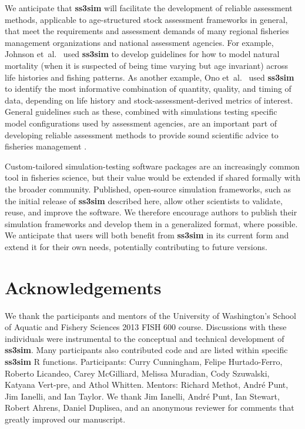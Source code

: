 \documentclass[11pt]{article}
\begin{document}
\begin{spacing}{1.2}
We anticipate that \textbf{ss3sim} will facilitate the development of reliable
assessment methods, applicable to age-structured stock assessment frameworks in
general, that meet the requirements and assessment demands of many regional
fisheries management organizations and national assessment agencies. For
example, Johnson et~al.~\cite{johnson2014} used \textbf{ss3sim} to
develop guidelines for how to model natural mortality (when it is suspected of
being time varying but age invariant) across life histories and fishing
patterns. As another example, Ono et~al.~\cite{ono2014} used
\textbf{ss3sim} to identify the most informative combination of quantity,
quality, and timing of data, depending on life history and
stock-assessment-derived metrics of interest. General guidelines such as these,
combined with simulations testing specific model configurations used by
assessment agencies, are an important part of developing reliable assessment
methods to provide sound scientific advice to fisheries management
\cite{deroba2014, crone2013}.

Custom-tailored simulation-testing software packages are an increasingly common
tool in fisheries science, but their value would be extended if shared formally
with the broader community. Published, open-source simulation frameworks, such
as the initial release of \textbf{ss3sim} described here, allow other
scientists to validate, reuse, and improve the software. We therefore encourage
authors to publish their simulation frameworks and develop them in a
generalized format, where possible. We anticipate that users will both benefit
from \textbf{ss3sim} in its current form and extend it for their own needs,
potentially contributing to future versions.

\section*{Acknowledgements}

We thank the participants and mentors of the University of Washington's School
of Aquatic and Fishery Sciences 2013 FISH 600 course. Discussions with these
individuals were instrumental to the conceptual and technical development of
\textbf{ss3sim}. Many participants also contributed code and are listed within
specific \textbf{ss3sim} \textsf{R} functions. Participants: Curry Cunningham,
Felipe Hurtado-Ferro, Roberto Licandeo, Carey McGilliard, Melissa Muradian,
Cody Szuwalski, Katyana Vert-pre, and Athol Whitten. Mentors: Richard Methot,
Andr\'{e} Punt, Jim Ianelli, and Ian Taylor. We thank Jim Ianelli, Andr\'{e}
Punt, Ian Stewart, Robert Ahrens, Daniel Duplisea, and an anonymous reviewer
for comments that greatly improved our manuscript.


\end{spacing}
\end{document}
